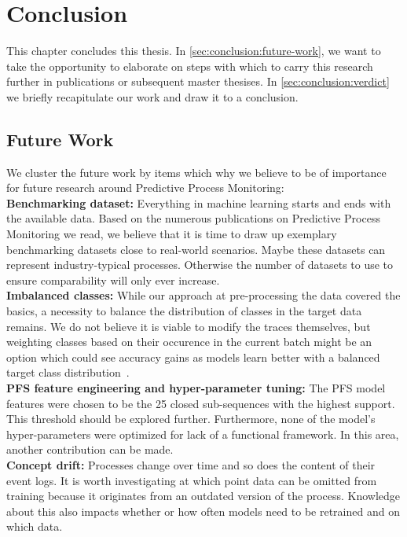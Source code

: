 \chapter{Conclusion} \label{chap:conclusion}
This chapter concludes this thesis. In \autoref{sec:conclusion:future-work}, we want to take the opportunity to elaborate on steps with which to carry this research further in publications or subsequent master thesises. In \autoref{sec:conclusion:verdict} we briefly recapitulate our work and draw it to a conclusion.

\section{Future Work} \label{sec:conclusion:future-work}
We cluster the future work by items which why we believe to be of importance for future research around Predictive Process Monitoring:\\

\noindent\textbf{Benchmarking dataset:} Everything in machine learning starts and ends with the available data. Based on the numerous publications on Predictive Process Monitoring we read, we believe that it is time to draw up exemplary benchmarking datasets close to real-world scenarios. Maybe these datasets can represent industry-typical processes. Otherwise the number of datasets to use to ensure comparability will only ever increase.\\

\noindent\textbf{Imbalanced classes:} While our approach at pre-processing the data covered the basics, a necessity to balance the distribution of classes in the target data remains. We do not believe it is viable to modify the traces themselves, but weighting classes based on their occurence in the current batch might be an option which could see accuracy gains as models learn better with a balanced target class distribution~\cite{web:stackoverflow-keras-class-weights}.\\

\noindent\textbf{PFS feature engineering and hyper-parameter tuning:} The PFS model features  were chosen to be the 25 closed sub-sequences with the highest support. This threshold should be explored further. Furthermore, none of the model's hyper-parameters were optimized for lack of a functional framework. In this area, another contribution can be made.\\

\noindent\textbf{Concept drift:} Processes change over time and so does the content of their event logs. It is worth investigating at which point data can be omitted from training because it originates from an outdated version of the process. Knowledge about this also impacts whether or how often models need to be retrained and on which data.\\

